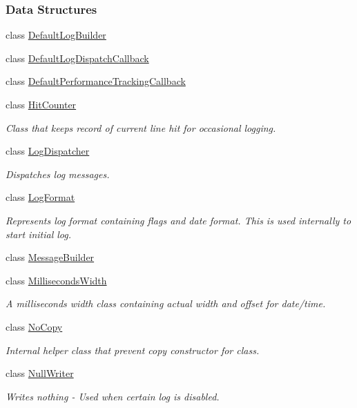 \subsubsection*{Data Structures}
\begin{DoxyCompactItemize}
\item 
class \hyperlink{a00023}{Default\+Log\+Builder}
\item 
class \hyperlink{a00024}{Default\+Log\+Dispatch\+Callback}
\item 
class \hyperlink{a00025}{Default\+Performance\+Tracking\+Callback}
\item 
class \hyperlink{a00036}{Hit\+Counter}
\begin{DoxyCompactList}\small\item\em Class that keeps record of current line hit for occasional logging. \end{DoxyCompactList}\item 
class \hyperlink{a00045}{Log\+Dispatcher}
\begin{DoxyCompactList}\small\item\em Dispatches log messages. \end{DoxyCompactList}\item 
class \hyperlink{a00046}{Log\+Format}
\begin{DoxyCompactList}\small\item\em Represents log format containing flags and date format. This is used internally to start initial log. \end{DoxyCompactList}\item 
class \hyperlink{a00052}{Message\+Builder}
\item 
class \hyperlink{a00053}{Milliseconds\+Width}
\begin{DoxyCompactList}\small\item\em A milliseconds width class containing actual width and offset for date/time. \end{DoxyCompactList}\item 
class \hyperlink{a00059}{No\+Copy}
\begin{DoxyCompactList}\small\item\em Internal helper class that prevent copy constructor for class. \end{DoxyCompactList}\item 
class \hyperlink{a00062}{Null\+Writer}
\begin{DoxyCompactList}\small\item\em Writes nothing -\/ Used when certain log is disabled. \end{DoxyCompactList}\item 

\end{DoxyCompactItemize}
